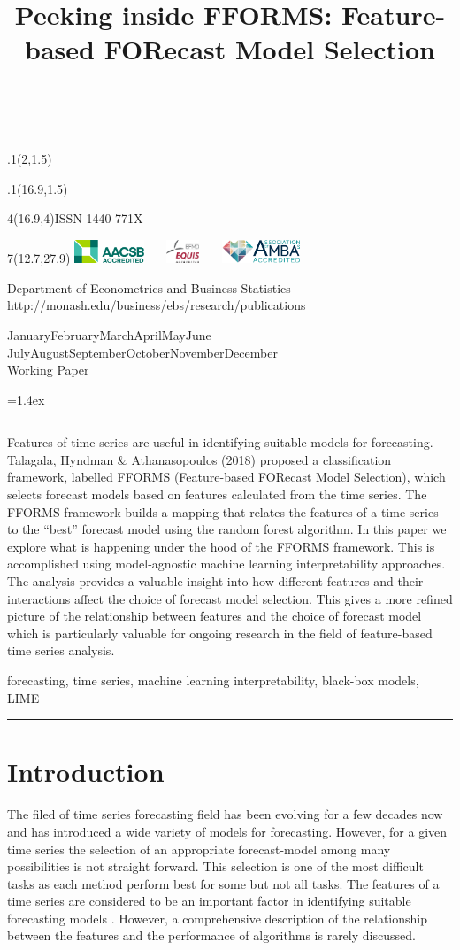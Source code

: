 \documentclass[11pt,a4paper,]{article}
\title{Peeking inside FFORMS: Feature-based FORecast Model Selection}
\date{\sf\Date~\Month~\Year}
\makeatletter
\def\Date{\number\day}
\def\Month{\ifcase\month\or
 January\or February\or March\or April\or May\or June\or
 July\or August\or September\or October\or November\or December\fi}
\def\Year{\number\year}
\def\showjel{{\large\textsf{\textbf{JEL classification:}}~\@jel}}
\def\cover{{\sffamily\setcounter{page}{0}
        \thispagestyle{empty}
        \placefig{2}{1.5}{width=5cm}{monash2}
        \placefig{16.9}{1.5}{width=2.1cm}{MBusSchool}
        \begin{textblock}{4}(16.9,4)ISSN 1440-771X\end{textblock}
        \begin{textblock}{7}(12.7,27.9)\hfill
        \includegraphics[height=0.7cm]{AACSB}~~~
        \includegraphics[height=0.7cm]{EQUIS}~~~
        \includegraphics[height=0.7cm]{AMBA}
        \end{textblock}
        \vspace*{2cm}
        \begin{center}\Large
        Department of Econometrics and Business Statistics\\[.5cm]
        \footnotesize http://monash.edu/business/ebs/research/publications
        \end{center}\vspace{2cm}
        \begin{center}
        \fbox{\parbox{14cm}{\begin{onehalfspace}\centering\Huge\vspace*{0.3cm}
                \textsf{\textbf{\expandafter{\@title}}}\vspace{1cm}\par
                \LARGE\@author\end{onehalfspace}
        }}
        \end{center}
        \vfill
                \begin{center}\Large
                \Month~\Year\\[1cm]
                Working Paper \@wp
        \end{center}\vspace*{2cm}}}
\def\pageone{{\sffamily\setstretch{1}%
        \thispagestyle{empty}%
        \vbox to \textheight{%
        \raggedright\baselineskip=1.2cm
     {\fontsize{24.88}{30}\sffamily\textbf{\expandafter{\@title}}}
        \vspace{2cm}\par
        \hspace{1cm}\parbox{14cm}{\sffamily\large\@addresses}\vspace{1cm}\vfill
        \hspace{1cm}{\large\Date~\Month~\Year}\\[1cm]
        \hspace{1cm}\showjel\vss}}}
\def\blindtitle{{\sffamily
     \thispagestyle{plain}\raggedright\baselineskip=1.2cm
     {\fontsize{24.88}{30}\sffamily\textbf{\expandafter{\@title}}}\vspace{1cm}\par
        }}
\def\titlepage{{\cover\newpage\pageone\newpage\blindtitle}}
\let\maketitle\titlepage
\newenvironment{keywords}{\par\vspace{0.5cm}\noindent{\sffamily\textbf{Keywords:}}}{\vspace{0.25cm}\par\hrule\vspace{0.5cm}\par}
\renewenvironment{abstract}{\begin{minipage}{\textwidth}\parskip=1.4ex\noindent
\hrule\vspace{0.1cm}\par{\sffamily\textbf{\abstractname}}\newline}
  {\end{minipage}}
\def\placefig#1#2#3#4{\begin{textblock}{.1}(#1,#2)\rlap{\texttt{[image: \#4]}}\end{textblock}}
\makeatother
\begin{document}
\maketitle
\begin{abstract}
Features of time series are useful in identifying suitable models for
forecasting. Talagala, Hyndman \& Athanasopoulos (2018) proposed a
classification framework, labelled FFORMS (Feature-based FORecast Model
Selection), which selects forecast models based on features calculated
from the time series. The FFORMS framework builds a mapping that relates
the features of a time series to the ``best'' forecast model using the
random forest algorithm. In this paper we explore what is happening
under the hood of the FFORMS framework. This is accomplished using
model-agnostic machine learning interpretability approaches. The
analysis provides a valuable insight into how different features and
their interactions affect the choice of forecast model selection. This
gives a more refined picture of the relationship between features and
the choice of forecast model which is particularly valuable for ongoing
research in the field of feature-based time series analysis.
\end{abstract}
\begin{keywords}
forecasting, time series, machine learning interpretability, black-box
models, LIME
\end{keywords}

\section{Introduction}\label{intro}

The filed of time series forecasting field has been evolving for a few
decades now and has introduced a wide variety of models for forecasting.
However, for a given time series the selection of an appropriate
forecast-model among many possibilities is not straight forward. This
selection is one of the most difficult tasks as each method perform best
for some but not all tasks. The features of a time series are considered
to be an important factor in identifying suitable forecasting models
\autocites{collopy1992rule}{meade2000evidence}{makridakis2000m3}{wang2009rule}.
However, a comprehensive description of the relationship between the
features and the performance of algorithms is rarely discussed.
\end{document}
